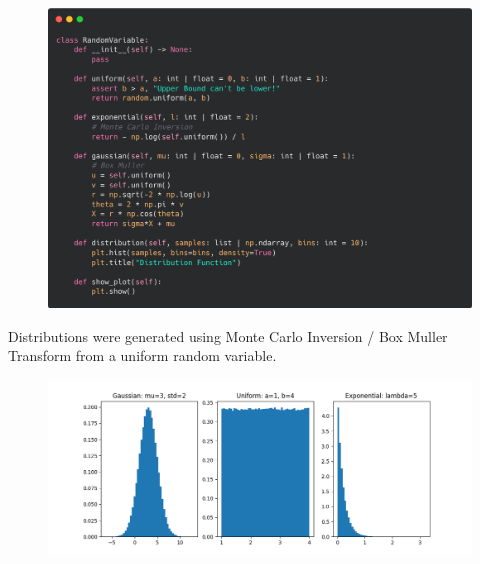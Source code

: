 \documentclass[12pt]{article}
\begin{document}
\begin{figure}[H] 
\centering \includegraphics[scale=0.25]{code-rv.png}  
\end{figure}
\raggedright Distributions were generated using Monte Carlo Inversion / Box Muller Transform from a uniform random variable.
\begin{figure}[H] 
\centering \includegraphics[scale=0.6]{distributions.png}
\end{figure}
\end{document}
